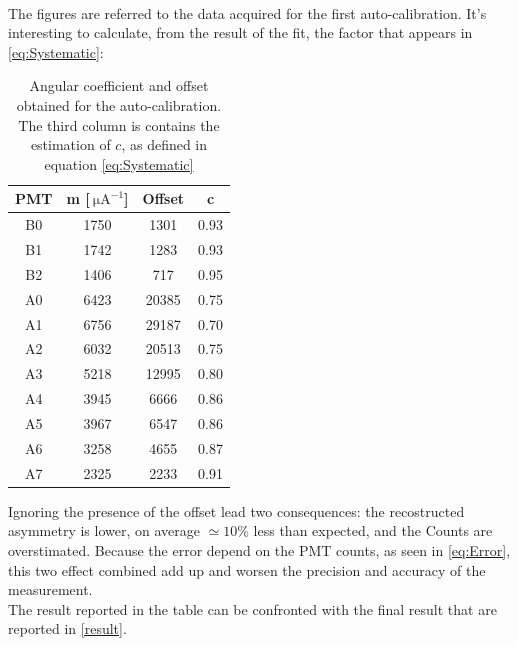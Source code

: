 \begin{figure}[ht]
\centering
{} \\
\end{figure}

\newpage
The figures are referred to the data acquired for the first auto-calibration. It's interesting to calculate, from the result of the fit, the factor that appears in \ref{eq:Systematic}:

\begin{table}[ht]
\centering
\begin{tabular}{c|c|c|c}
\hline
 PMT & m [$\SI{}{\micro \ampere}^{-1}$] & Offset & c  \\
\hline
 B0  & 1750 &  1301 &  0.93 \\
 B1  & 1742 &  1283 &  0.93 \\
 B2  & 1406 &   717 &  0.95 \\
 A0  & 6423 & 20385 &  0.75 \\
 A1  & 6756 & 29187 &  0.70 \\
 A2  & 6032 & 20513 &  0.75 \\
 A3  & 5218 & 12995 &  0.80 \\
 A4  & 3945 &  6666 &  0.86 \\
 A5  & 3967 &  6547 &  0.86 \\
 A6  & 3258 &  4655 &  0.87 \\
 A7  & 2325 &  2233 &  0.91 \\
\hline
\end{tabular}
\caption{Angular coefficient and offset obtained for the auto-calibration. The third column is contains the estimation of $c$, as defined in equation \ref{eq:Systematic} }
\end{table}
Ignoring the presence of the offset lead two consequences: the recostructed asymmetry is lower, on average $ \simeq 10\%$ less than expected, and the Counts are overstimated. Because the error depend on the PMT counts, as seen in \ref{eq:Error}, this two effect combined add up and worsen the precision and accuracy of the measurement.\\
The result reported in the table can be confronted with the final result that are reported in \ref{result}. 

